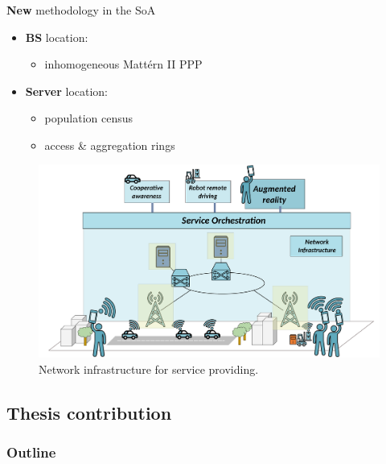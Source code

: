 \documentclass[aspectratio=169]{beamer}
\begin{document}
\begin{frame}
    \frametitle{\secname}
    \framesubtitle{\subsecname}

    \begin{minipage}{.45\textwidth}
        {\color{red}\textbf{New}} methodology in the SoA
        \begin{itemize}
            \item \textbf{BS} location:
                \begin{itemize}
                    \item inhomogeneous Mattérn II PPP
                \end{itemize}
            \item \textbf{Server} location:
                \begin{itemize}
                    \item population census
                    \item access \& aggregation rings
                \end{itemize}
        \end{itemize}
    \end{minipage}
    \begin{minipage}{.5\textwidth}
            \begin{figure}
                \centering
                \includegraphics[width=\textwidth]{img/big-picture-infra-gen-highlight-ar.pdf}
                \caption{Network infrastructure for service providing.}
                \label{fig:big-infra}
            \end{figure}
    \end{minipage}
\end{frame}




\subsection{Thesis contribution}
\begin{frame}
    \frametitle{Outline}
    \tableofcontents[subsectionstyle=show/shaded/hide,sectionstyle=show/shaded]
\end{frame}
\end{document}
